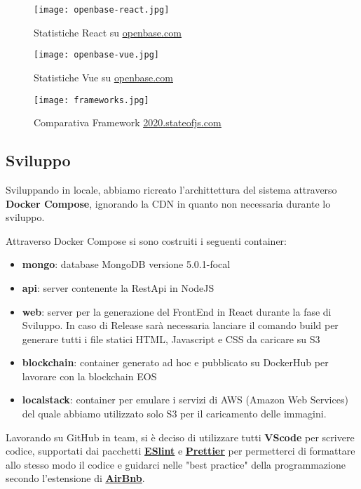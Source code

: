\begin{figure} 
	\centering
	\texttt{[image: openbase-react.jpg]}
	\caption{Statistiche React su \underline{\href{https://openbase.com/js/react}{openbase.com}}}
	\label{fig:openbaseReact}
\end{figure}
\begin{figure} 
	\centering
	\texttt{[image: openbase-vue.jpg]}
	\caption{Statistiche Vue su \underline{\href{https://openbase.com/js/vue}{openbase.com}}}
	\label{fig:openbaseVue}
\end{figure}
\begin{figure} 
	\centering
	\texttt{[image: frameworks.jpg]}
	\caption{Comparativa Framework \underline{\href{https://2020.stateofjs.com/en-US/technologies/front-end-frameworks/}{2020.stateofjs.com}}}
	\label{fig:frameworks}
\end{figure}

\clearpage

\subsection{Sviluppo}
Sviluppando in locale, abbiamo ricreato l'archittettura del sistema attraverso \textbf{Docker Compose}, 
ignorando la CDN in quanto non necessaria durante lo sviluppo.

Attraverso Docker Compose si sono costruiti i seguenti container:
\begin{itemize}
	\item \textbf{mongo}: database MongoDB versione 5.0.1-focal
	\item \textbf{api}: server contenente la RestApi in NodeJS
	\item \textbf{web}: server per la generazione del FrontEnd in React durante la fase di Sviluppo. In caso di Release sarà necessaria lanciare il comando build per generare tutti i file statici HTML, Javascript e CSS da caricare su S3
	\item \textbf{blockchain}: container generato ad hoc e pubblicato su DockerHub per lavorare con la blockchain EOS
	\item \textbf{localstack}: container per emulare i servizi di AWS (Amazon Web Services) del quale abbiamo utilizzato solo S3 per il caricamento delle immagini.
\end{itemize}

Lavorando su GitHub in team, si è deciso di utilizzare tutti \textbf{VScode} per scrivere codice, 
supportati dai pacchetti \textbf{\underline{\href{https://eslint.org/docs/user-guide/getting-started}{ESlint}}} e \textbf{\underline{\href{https://prettier.io/docs/en/index.html}{Prettier}}} per permetterci di formattare allo stesso modo il codice
e guidarci nelle "best practice" della programmazione secondo l'estensione di  \textbf{\underline{\href{https://www.npmjs.com/package/eslint-config-airbnb}{AirBnb}}}.
 
